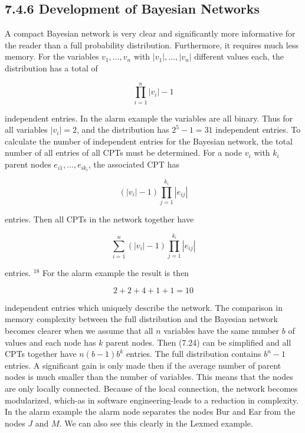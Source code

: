 \documentclass[10pt]{book}
\begin{document}
\begin{center}
\begin{enumerate}
\subsection*{7.4.6 Development of Bayesian Networks}
A compact Bayesian network is very clear and significantly more informative for the reader than a full probability distribution. Furthermore, it requires much less memory. For the variables $v_{1}, \ldots, v_{n}$ with $\left|v_{1}\right|, \ldots,\left|v_{n}\right|$ different values each, the distribution has a total of

$$
\prod_{i=1}^{n}\left|v_{i}\right|-1
$$

independent entries. In the alarm example the variables are all binary. Thus for all variables $\left|v_{i}\right|=2$, and the distribution has $2^{5}-1=31$ independent entries. To calculate the number of independent entries for the Bayesian network, the total number of all entries of all CPTs must be determined. For a node $v_{i}$ with $k_{i}$ parent nodes $e_{i 1}, \ldots, e_{i k_{i}}$, the associated CPT has

$$
\left(\left|v_{i}\right|-1\right) \prod_{j=1}^{k_{i}}\left|e_{i j}\right|
$$

entries. Then all CPTs in the network together have


\begin{equation*}
\sum_{i=1}^{n}\left(\left|v_{i}\right|-1\right) \prod_{j=1}^{k_{i}}\left|e_{i j}\right| \tag{7.24}
\end{equation*}


entries. ${ }^{18}$ For the alarm example the result is then

$$
2+2+4+1+1=10
$$

independent entries which uniquely describe the network. The comparison in memory complexity between the full distribution and the Bayesian network becomes clearer when we assume that all $n$ variables have the same number $b$ of values and each node has $k$ parent nodes. Then (7.24) can be simplified and all CPTs together have $n(b-1) b^{k}$ entries. The full distribution contains $b^{n}-1$ entries. A significant gain is only made then if the average number of parent nodes is much smaller than the number of variables. This means that the nodes are only locally connected. Because of the local connection, the network becomes modularized, which-as in software engineering-leads to a reduction in complexity. In the alarm example the alarm node separates the nodes Bur and Ear from the nodes $J$ and $M$. We can also see this clearly in the Lexmed example.


\end{enumerate}
\end{center}
\end{document}

